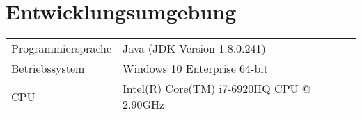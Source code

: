 \chapter{Entwicklungsumgebung}\label{ch:entwicklungsumgebung}


\begin{table}[!htb]
    \centering
    \begin{tabularx}{\textwidth}{X | X }
        Programmiersprache               & Java (JDK Version 1.8.0.241)             \\
        Betriebssystem                   & Windows 10 Enterprise 64-bit             \\
        CPU                              & Intel(R) Core(TM) i7-6920HQ CPU @ 2.90GHz

    \end{tabularx}
\end{table}
